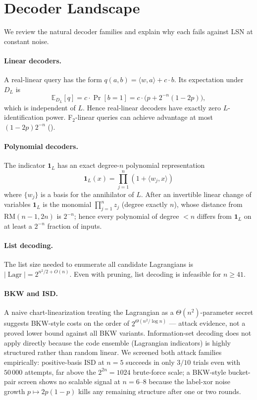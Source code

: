 \documentclass[11pt,a4paper]{article}
\theoremstyle{plain}
\theoremstyle{definition}
\newcommand{\E}{\mathbb{E}}
\DeclareMathOperator{\Lagr}{Lagr}
\begin{document}
\section{Decoder Landscape}
\label{sec:decoders}

We review the natural decoder families and explain why each fails against LSN at constant noise.

\paragraph{Linear decoders.}
A real-linear query has the form $q(a,b) = \langle w, a \rangle + c \cdot b$. Its expectation under $D_L$ is
\[
\E_{D_L}[q] = c \cdot \Pr[b=1] = c \cdot \bigl(p + 2^{-n}(1-2p)\bigr),
\]
which is independent of $L$. Hence real-linear decoders have exactly zero $L$-identification power. F$_2$-linear queries can achieve advantage at most $(1-2p)2^{-n}$ ().

\paragraph{Polynomial decoders.}
The indicator $\mathbf{1}_L$ has an exact degree-$n$ polynomial representation
\[
\mathbf{1}_L(x) = \prod_{j=1}^n (1 + \langle w_j, x \rangle)
\]
where $\{w_j\}$ is a basis for the annihilator of $L$. After an invertible linear change of variables $\mathbf 1_L$ is the monomial $\prod_{j=1}^n z_j$ (degree exactly $n$), whose distance from $\mathrm{RM}(n-1,2n)$ is $2^{-n}$; hence every polynomial of degree $<n$ differs from $\mathbf 1_L$ on at least a $2^{-n}$ fraction of inputs.

\paragraph{List decoding.}
The list size needed to enumerate all candidate Lagrangians is $|\Lagr| = 2^{n^2/2 + O(n)}$. Even with pruning, list decoding is infeasible for $n \geq 41$.

\paragraph{BKW and ISD.}
A naive chart-linearization treating the Lagrangian as a $\Theta(n^2)$-parameter secret suggests BKW-style costs on the order of $2^{\Theta(n^2 / \log n)}$ --- attack evidence, not a proved lower bound against all BKW variants. Information-set decoding does not apply directly because the code ensemble (Lagrangian indicators) is highly structured rather than random linear.  We screened both attack families empirically: positive-basis ISD at $n=5$ succeeds in only $3/10$ trials even with $50\,000$ attempts, far above the $2^{2n}=1024$ brute-force scale; a BKW-style bucket-pair screen shows no scalable signal at $n=6$--$8$ because the label-xor noise growth $p\mapsto2p(1-p)$ kills any remaining structure after one or two rounds.
\end{document}
